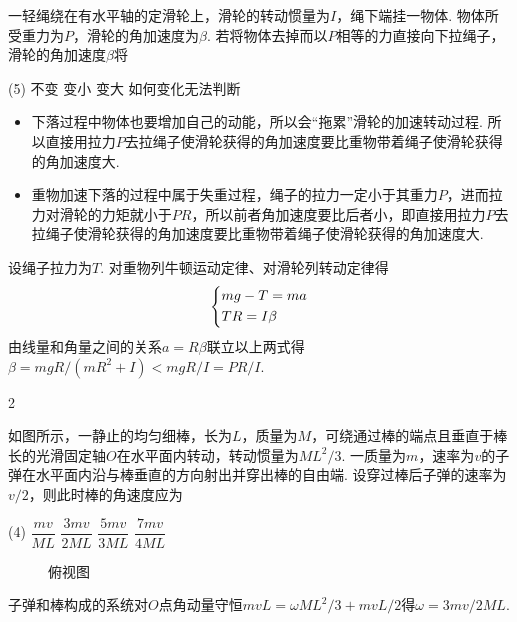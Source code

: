 \begin{problem} %
一轻绳绕在有水平轴的定滑轮上，滑轮的转动惯量为$I$，绳下端挂一物体. 物体所受重力为$P$，滑轮的角加速度为$\beta$. 若将物体去掉而以$P$相等的力直接向下拉绳子，滑轮的角加速度$\beta$将
\begin{tasks}(5)
    \task 不变
    \task 变小
    \task[\true] 变大
    \task* 如何变化无法判断
\end{tasks}
\end{problem}
\begin{note}\leavevmode
\begin{itemize}
    \item 下落过程中物体也要增加自己的动能，所以会``拖累''滑轮的加速转动过程. 所以直接用拉力$P$去拉绳子使滑轮获得的角加速度要比重物带着绳子使滑轮获得的角加速度大.
    \item 重物加速下落的过程中属于失重过程，绳子的拉力一定小于其重力$P$，进而拉力对滑轮的力矩就小于$PR$，所以前者角加速度要比后者小，即直接用拉力$P$去拉绳子使滑轮获得的角加速度要比重物带着绳子使滑轮获得的角加速度大.
\end{itemize}
\end{note}
\begin{solution}
设绳子拉力为$T$. 对重物列牛顿运动定律、对滑轮列转动定律得
\[\begin{dcases}
    mg-T=ma\\
    TR=I\beta
\end{dcases}\]
由线量和角量之间的关系$a=R\beta$联立以上两式得$\beta=mgR/(mR^2+I)<mgR/I=PR/I$.
\end{solution}

\begin{paracol}{2}
\begin{problem}
    如图所示，一静止的均匀细棒，长为$L$，质量为$M$，可绕通过棒的端点且垂直于棒长的光滑固定轴$O$在水平面内转动，转动惯量为$ML^2/3$. 一质量为$m$，速率为$v$的子弹在水平面内沿与棒垂直的方向射出并穿出棒的自由端. 设穿过棒后子弹的速率为$v/2$，则此时棒的角速度应为
    \begin{tasks}(4)
        \task $\dfrac{mv}{ML}$
        \task[\true] $\dfrac{3mv}{2ML}$
        \task $\dfrac{5mv}{3ML}$
        \task $\dfrac{7mv}{4ML}$
    \end{tasks}
    \switchcolumn\vspace*{\fill}
    \begin{figure}[htbp]
        \centering
        \caption*{俯视图}
    \end{figure}
    \vspace*{\fill}
\end{problem}
\end{paracol}
\begin{solution}
    子弹和棒构成的系统对$O$点角动量守恒$mvL=\omega ML^2/3+mvL/2$得$\omega=3mv/2ML$.
\end{solution}


